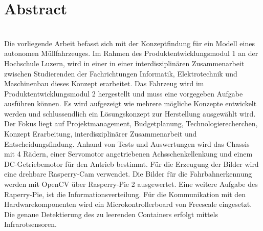 \section{Abstract}\\[0.2cm]
Die vorliegende Arbeit befasst sich mit der Konzeptfindung für ein Modell eines autonomen Müllfahrzeuges. Im Rahmen des Produktentwicklungsmodul 1 an der Hochschule Luzern, wird in einer in einer interdisziplinären Zusammenarbeit zwischen Studierenden der Fachrichtungen Informatik, Elektrotechnik und Maschinenbau dieses Konzept erarbeitet. Das Fahrzeug wird im Produktentwicklungsmodul 2 hergestellt und muss eine vorgegeben Aufgabe ausführen können. Es wird aufgezeigt wie mehrere mögliche Konzepte entwickelt werden und schlussendlich ein Lösungskonzept zur Herstellung ausgewählt wird. Der Fokus liegt auf Projektmanagement, Budgetplanung, Technologierecherchen, Konzept Erarbeitung, interdisziplinärer Zusammenarbeit und Entscheidungsfindung. Anhand von Tests und Auswertungen wird das Chassis mit 4 Rädern, einer Servomotor angetriebenen Achsschenkellenkung und einem DC-Getriebemotor für den Antrieb bestimmt. Für die Erzeugung der Bilder wird eine drehbare Rasperry-Cam verwendet. Die Bilder für die Fahrbahnerkennung werden mit OpenCV über Rasperry-Pie 2 ausgewertet. Eine weitere Aufgabe des Raperry-Pie, ist die Informationsverteilung. Für die Kommunikation mit den Hardwarekomponenten wird ein Microkontrollerboard von Freescale eingesetzt. Die genaue Detektierung des zu leerenden Containers erfolgt mittels Infrarotsensoren.  
\clearpage